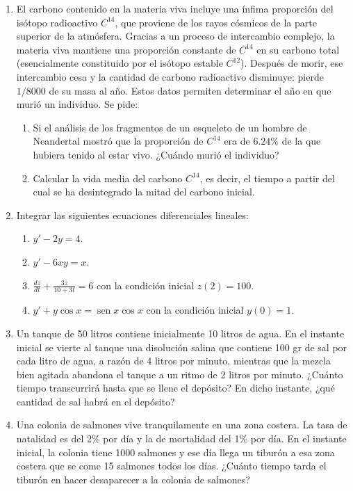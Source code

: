 \documentclass[a4paper,titlepage]{article}
\DeclareMathOperator{\sen}{sen}
\theoremstyle{solution}
\begin{document}
\begin{enumerate}[resume, leftmargin=*]
\item El carbono contenido en la materia viva incluye una ínfima proporción del isótopo radioactivo $C^{14}$, que proviene de los rayos cósmicos de la parte superior de la atmósfera.
Gracias a un proceso de intercambio complejo, la materia viva mantiene una proporción constante de $C^{14}$ en su carbono total (esencialmente constituido por el isótopo estable $C^{12}$).
Después de morir, ese intercambio cesa y la cantidad de carbono radioactivo disminuye: pierde $1/8000$ de su masa al año.
Estos datos permiten determinar el año en que murió un individuo. 
Se pide:
\begin{enumerate}
\item Si el análisis de los fragmentos de un esqueleto de un hombre de Neandertal mostró que la proporción de $C^{14}$ era de $6.24\%$ de la que hubiera tenido al estar vivo.
¿Cuándo murió el individuo?
\item Calcular la vida media del carbono $C^{14}$, es decir, el tiempo a partir del cual se ha desintegrado la mitad del carbono inicial.  
\end{enumerate}

\item Integrar las siguientes ecuaciones diferenciales lineales:
\begin{enumerate}
\item $y'-2y=4$.
\item $y'-6xy=x$.
\item $\frac{dz}{dt}+\frac{3z}{10+3t}=6$ con la condición inicial $z(2)=100$.
\item $y'+y\cos x=\sen x\cos x$ con la condición inicial $y(0)=1$.
\end{enumerate}

\item Un tanque de 50 litros contiene inicialmente 10 litros de agua.
En el instante inicial se vierte al tanque una disolución salina que contiene 100 gr de sal por cada litro de agua, a razón de 4 litros por minuto, mientras que la mezcla bien agitada abandona el tanque a un ritmo de 2 litros por minuto.
¿Cuánto tiempo transcurrirá hasta que se llene el depósito? En dicho instante, ¿qué cantidad de sal habrá en el depósito?

\item Una colonia de salmones vive tranquilamente en una zona costera.
La tasa de natalidad es del 2\% por día y la de mortalidad del 1\% por día. 
En el instante inicial, la colonia tiene 1000 salmones y ese día llega un tiburón a esa zona costera que se come 15 salmones todos los días.
¿Cuánto tiempo tarda el tiburón en hacer desaparecer a la colonia de salmones?


\end{enumerate}
\end{document}
